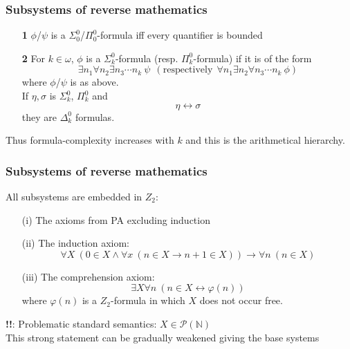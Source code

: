 \documentclass[10pt,danish]{beamer}
\begin{document}
\begin{frame}
 \frametitle{Subsystems of reverse mathematics}
\small
\begin{definition}
\begin{itemize}
\item[\textbf{1}] $\phi$/$\psi$ is a $\Sigma_{0}^{0}$/$\Pi_{0}^{0}$-formula iff every quantifier is bounded
\item[\textbf{2}] For $k \in \omega$, $\phi$ is a $\Sigma_{k}^{0}$-formula (resp. $\Pi_{k}^{0}$-formula)
if it is of the form 
\begin{displaymath}
\exists n_{1} \forall n_{2} \exists n_{3} \cdots
n_{k}\  \psi\ \ (\textrm{respectively}\ \ \forall n_{1} \exists n_{2} \forall n_{3} \cdots
n_{k}\ 
\phi)
\end{displaymath} where $\phi$/$\psi$ is as above.\\
If $\eta,\sigma$ is $\Sigma_{k}^{0}$, $\Pi_{k}^{0}$ and\\
\begin{displaymath}
\eta \leftrightarrow \sigma
\end{displaymath}
they are $\Delta ^0_k$ formulas.
\end{itemize}
Thus formula-complexity increases with $k$ and this is the arithmetical hierarchy.
\end{definition}
\end{frame}

\begin{frame}
 \frametitle{Subsystems of reverse mathematics}
All subsystems are embedded in $Z_2$:
\begin{definition}
\small
\begin{enumerate}
\item[(i)]  The axioms from PA excluding induction
\item[(ii)] The induction axiom:
\begin{displaymath}
\forall X\ (0 \in X \land \forall x\ (n \in X \rightarrow n+1 \in X)) \rightarrow \forall n\ (n \in X) 
\end{displaymath}
\item[(iii)] The comprehension axiom:
\begin{displaymath}
\exists X \forall n\ (n \in X \leftrightarrow \varphi(n))
\end{displaymath}
where $\varphi(n)$ is a $Z_2$-formula in which $X$ does not occur free.
\end{enumerate}
\end{definition}
\textbf{!!}: Problematic standard semantics: $X \in \mathcal{P}(\mathbb{N})$\\
This strong statement can be gradually weakened giving the base systems
\end{frame}
\end{document}
